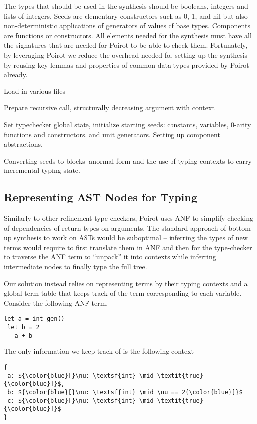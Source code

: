 \documentclass[review, sigplan]{acmart}
\begin{document}
The types that should be used in the synthesis should be
booleans, integers and lists of integers.
Seeds are elementary constructors such as 0, 1, and \textsf{nil}
but also non-deterministic applications of generators of values of
base types. Components are functions or constructors.
All elements needed for the synthesis must have all the signatures
that are needed for Poirot to be able to check them.
Fortunately, by leveraging Poirot we reduce the overhead needed for setting
up the synthesis by reusing key lemmas and properties of common
data-types provided by Poirot already.

Load in various files

Prepare recursive call, structurally decreasing argument with context

Set typechecker global state, initialize starting seeds: constants, variables,
0-arity functions and constructors, and unit generators. Setting up component
abstractions.

Converting seeds to blocks, anormal form and the use of typing contexts to carry
incremental typing state.

\subsection{Representing AST Nodes for Typing}
Similarly to other refinement-type checkers, Poirot uses
ANF to simplify checking of dependencies of return types on arguments.
The standard approach of bottom-up synthesis to work on ASTs would
be suboptimal -- inferring the types of new terms would require to
first translate them in ANF and then for the type-checker to traverse
the ANF term to ``unpack'' it into contexts while inferring intermediate
nodes to finally type the full tree.

Our solution instead relies on representing terms by their
typing contexts and a global term table that keeps track of
the term corresponding to each variable.
Consider the following ANF term.
\begin{lstlisting}[language=caml, basicstyle=\small\ttfamily]
let a = int_gen()
 let b = 2
   a + b
\end{lstlisting}

The only information we keep track of is the following context

\begin{lstlisting}[language=caml, basicstyle=\small\ttfamily, mathescape]
{
 a: ${\color{blue}[}\nu: \textsf{int} \mid \textit{true}{\color{blue}]}$,
 b: ${\color{blue}[}\nu: \textsf{int} \mid \nu == 2{\color{blue}]}$
 c: ${\color{blue}[}\nu: \textsf{int} \mid \textit{true}{\color{blue}]}$
}
\end{lstlisting}
\end{document}
